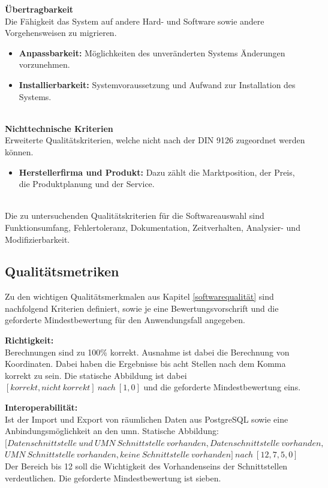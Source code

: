 \newpage
\textbf{Übertragbarkeit}\\
Die Fähigkeit das System auf andere Hard- und Software sowie andere Vorgehensweisen zu migrieren.
\begin{itemize}
\item \textbf{Anpassbarkeit:} Möglichkeiten des unveränderten Systems Änderungen vorzunehmen.
\item \textbf{Installierbarkeit:} Systemvoraussetzung und Aufwand zur Installation des Systems.
\end{itemize}
\ \\
%
\textbf{Nichttechnische Kriterien}\\
Erweiterte Qualitätskriterien, welche nicht nach der DIN 9126 zugeordnet werden können.
\begin{itemize}
\item \textbf{Herstellerfirma und Produkt:} Dazu zählt die Marktposition, der Preis, die Produktplanung und der Service.
\end{itemize}
\ \\
%
Die zu untersuchenden Qualitätskriterien für die Softwareauswahl sind Funktionsumfang, Fehlertoleranz, Dokumentation, Zeitverhalten, Analysier- und Modifizierbarkeit.


\subsection{Qualitätsmetriken}
\label{qualitätsmetriken}
Zu den wichtigen Qualitätsmerkmalen aus Kapitel \ref{softwarequalität} sind nachfolgend Kriterien definiert, sowie je eine Bewertungsvorschrift und die geforderte Mindestbewertung für den Anwendungsfall angegeben.

\textbf{Richtigkeit:}\\
Berechnungen sind zu 100\% korrekt. Ausnahme ist dabei die Berechnung von Koordinaten. Dabei haben die Ergebnisse bis acht Stellen nach dem Komma korrekt zu sein.
Die statische Abbildung ist dabei $[korrekt, nicht\ korrekt]\ nach\ [1, 0]$ und die geforderte Mindestbewertung eins.

\textbf{Interoperabilität:}\\
Ist der Import und Export von räumlichen Daten aus PostgreSQL sowie eine Anbindungsmöglichkeit an den \Gls{umn}.
Statische Abbildung:\\
$[Datenschnittstelle\ und\ UMN\ Schnittstelle\ vorhanden,Datenschnittstelle\ vorhanden,$\\$UMN\ Schnittstelle\ vorhanden,keine\ Schnittstelle\ vorhanden]\ nach\ [12,7,5,0]$\\
Der Bereich bis 12 soll die Wichtigkeit des Vorhandenseins der Schnittstellen verdeutlichen.
Die geforderte Mindestbewertung ist sieben.

